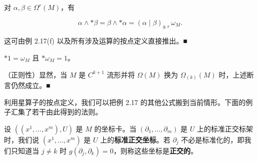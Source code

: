 \begin{remark}
\begin{items}
对 $ \alpha, \beta \in \Omega^{r}(M) $，有

\begin{equation}
\alpha \wedge \ast\beta = \beta \wedge \ast\alpha = (\alpha \mid \beta)_{g,r}\,\omega_{M} .\tag{5.22}
\end{equation}

\proofhead
这可由例 2.17(f) 以及所有涉及运算的按点定义直接推出。\nobreak\hspace{0.35em}■
\item

$ \ast 1 = \omega_{M} $ 且 $ \ast\omega_{M} = 1 $。

\item

（正则性）显然，当 $ M $ 是 $ C^{k+1} $ 流形并将 $ \Omega(M) $ 换为 $ \Omega_{(k)}(M) $ 时，上述断言仍然成立。\nobreak\hspace{0.35em}■

\end{items}

利用星算子的按点定义，我们可以把例 2.17 的其他公式搬到当前情形。下面的例子汇集了若干由此得到的法则。

设 $ ((x^{1},\ldots,x^{m}),U) $ 是 $ M $ 的坐标卡。当 $ (\partial_{1},\ldots,\partial_{m}) $ 是 $ U $ 上的标准正交标架时，我们说 $ (x^{1},\ldots,x^{m}) $ 是 $ U $ 上的\textbf{标准正交坐标}。若 $ \partial_{j} $ 不必是标准化的，即我们只知道当 $ j \ne k $ 时 $ g(\partial_{j},\partial_{k}) = 0 $，则称这些坐标是\textbf{正交的}。

\end{remark}

